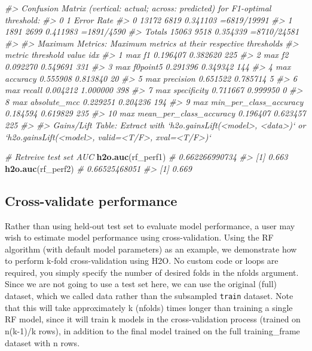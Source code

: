 \documentclass[]{book}
\newenvironment{Shaded}{\begin{snugshade}}{\end{snugshade}}
\newcommand{\CommentTok}[1]{\textcolor[rgb]{0.56,0.35,0.01}{\textit{#1}}}
\newcommand{\KeywordTok}[1]{\textcolor[rgb]{0.13,0.29,0.53}{\textbf{#1}}}
\newcommand{\NormalTok}[1]{#1}
\begin{document}
\begin{Shaded}
\begin{Highlighting}[]
\CommentTok{#> Confusion Matrix (vertical: actual; across: predicted) for F1-optimal threshold:}
\CommentTok{#>            0    1    Error         Rate}
\CommentTok{#> 0      13172 6819 0.341103  =6819/19991}
\CommentTok{#> 1       1891 2699 0.411983   =1891/4590}
\CommentTok{#> Totals 15063 9518 0.354339  =8710/24581}
\CommentTok{#> }
\CommentTok{#> Maximum Metrics: Maximum metrics at their respective thresholds}
\CommentTok{#>                         metric threshold    value idx}
\CommentTok{#> 1                       max f1  0.196407 0.382620 225}
\CommentTok{#> 2                       max f2  0.092270 0.549691 331}
\CommentTok{#> 3                 max f0point5  0.291396 0.349342 144}
\CommentTok{#> 4                 max accuracy  0.555908 0.813840  20}
\CommentTok{#> 5                max precision  0.651522 0.785714   5}
\CommentTok{#> 6                   max recall  0.004212 1.000000 398}
\CommentTok{#> 7              max specificity  0.711667 0.999950   0}
\CommentTok{#> 8             max absolute_mcc  0.229251 0.204236 194}
\CommentTok{#> 9   max min_per_class_accuracy  0.184594 0.619829 235}
\CommentTok{#> 10 max mean_per_class_accuracy  0.196407 0.623457 225}
\CommentTok{#> }
\CommentTok{#> Gains/Lift Table: Extract with `h2o.gainsLift(<model>, <data>)` or `h2o.gainsLift(<model>, valid=<T/F>, xval=<T/F>)`}

\CommentTok{# Retreive test set AUC}
\KeywordTok{h2o.auc}\NormalTok{(rf_perf1)  }\CommentTok{# 0.662266990734}
\CommentTok{#> [1] 0.663}
\KeywordTok{h2o.auc}\NormalTok{(rf_perf2)  }\CommentTok{# 0.66525468051}
\CommentTok{#> [1] 0.669}
\end{Highlighting}
\end{Shaded}

\hypertarget{cross-validate-performance}{%
\subsection{Cross-validate performance}\label{cross-validate-performance}}

Rather than using held-out test set to evaluate model performance, a user may wish
to estimate model performance using cross-validation. Using the RF algorithm
(with default model parameters) as an example, we demonstrate how to perform k-fold
cross-validation using H2O. No custom code or loops are required, you simply specify
the number of desired folds in the nfolds argument.
Since we are not going to use a test set here, we can use the original (full) dataset,
which we called data rather than the subsampled \texttt{train} dataset. Note that this will
take approximately k (nfolds) times longer than training a single RF model, since it
will train k models in the cross-validation process (trained on n(k-1)/k rows), in
addition to the final model trained on the full training\_frame dataset with n rows.
\end{document}
